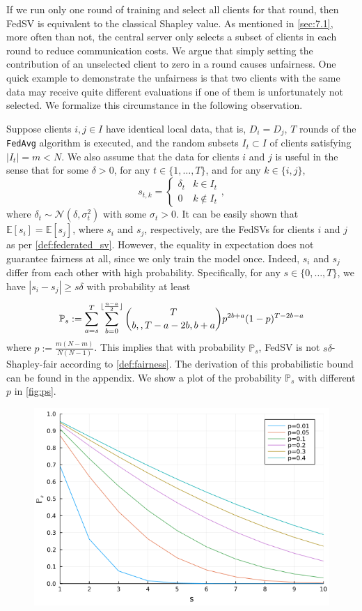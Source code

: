 If we run only one round of training and select all clients for that round, then FedSV is equivalent to the classical Shapley value.  As mentioned in \autoref{sec:7.1}, more often than not, the central server only selects a subset of clients in each round to reduce communication costs. We argue that simply setting the contribution of an unselected client to zero in a round causes unfairness. One quick example to demonstrate the unfairness is that two clients with the same data may receive quite different evaluations if one of them is unfortunately not selected. We formalize this circumstance in the following observation. 

\begin{observation} \label{obs:unfairness_fedsv}
    Suppose clients $i, j \in I$ have identical local data, that is, $D_i = D_j$, $T$ rounds of the \texttt{FedAvg} algorithm is executed, and the random subsets $I_t \subset I$ of clients satisfying $|I_t| = m < N$. We also assume that the data for clients $i$ and $j$ is useful in the sense that for some $\delta > 0$, for any $t \in \{1, \dots, T\}$, and for any $k \in \{i,j\}$,
    \[s_{t, k} = 
        \begin{cases} 
      \delta_t & k \in I_t \\
      0 & k \notin I_t 
   \end{cases},\]
   where $\delta_t \sim \mathcal{N}(\delta, \sigma_t^2)$ with some $\sigma_t > 0$. It can be easily shown that $\mathbb{E}[s_i] = \mathbb{E}[s_j]$, where $s_i$ and $s_j$, respectively, are the FedSVs for clients $i$ and $j$ as per \autoref{def:federated_sv}. However, the equality in expectation does not guarantee fairness at all, since we only train the model once.
Indeed, $s_i$ and $s_j$ differ from each other with high probability. Specifically, for any $s \in \{0, \dots, T\}$, we have $|s_i - s_j| \geq s\delta$ with probability at least
    \[\mathbb{P}_s := \sum_{a = s}^T \sum_{b=0}^{\lfloor\frac{n-a}{2}\rfloor} \binom{T}{b,, T - a - 2b, b+a} p^{2b + a} (1-p)^{T - 2b - a}\]
    where $p := \frac{m(N-m)}{N(N-1)}$. This implies that with probability $\mathbb{P}_s$, FedSV is not $s\delta$-Shapley-fair according to \autoref{def:fairness}. The derivation of this probabilistic bound can be found in the appendix. We show a plot of the probability $\mathbb{P}_s$ with different $p$ in \autoref{fig:ps}.
    \begin{figure}[t]
        \centering
        \includegraphics[width=.7\textwidth]{./figures/ps.png}

\end{figure}
\end{observation}
